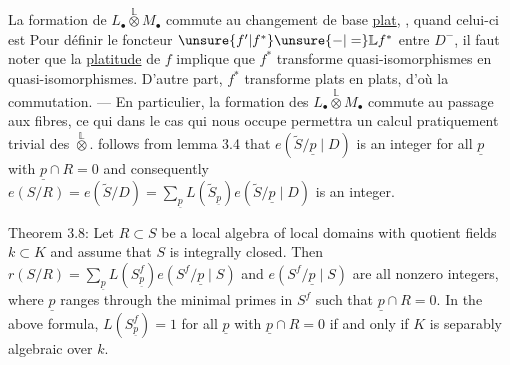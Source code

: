 La formation de $L_\bullet\overset{\mathbb L}{\otimes}M_\bullet$ commute au changement de base \uline{plat}, , quand celui-ci est \deleted{\unsure{défini convenablement} : [\unsure{mais aussi}}
Pour définir le foncteur $\unsure{f'|f^*}\unsure{-|=}\mathbb Lf^*$ entre $D^-$, il faut noter que la \uline{platitude} de $f$ implique que $f^*$ transforme quasi-isomorphismes en quasi-isomorphismes. D'autre part, $f^*$ transforme plats en plats, d'où la commutation.
--- En particulier, la formation des $L_\bullet\overset{\mathbb L}{\otimes}M_\bullet$ commute au passage aux fibres, ce qui dans le cas qui nous occupe permettra  un calcul pratiquement trivial des $\overset{\mathbb L}{\otimes}$.
follows from lemma 3.4 that $e(\widetilde S/\underline p\mid D)$ is an integer for all $\underline p$ with $\underline p\cap R=0$ and consequently $e(S/R)=e(\widetilde S/D)=\sum_{\underline p}L(\widetilde S_{\underline p})e(\widetilde S/\underline p\mid D)$ is an integer.

Theorem 3.8: Let $R\subset S$ be a local algebra of local domains with quotient fields $k\subset K$ and assume that $S$ is integrally closed. Then $r(S/R)=\sum_{\underline p}L(S_{\underline p}^f)e(S^f/\underline p\mid S)$ and $e(S^f/\underline p\mid S)$ are all nonzero integers, where $\underline p$ ranges through the minimal primes in $S^f$ such that $\underline p\cap R=0$. In the above formula, $L(S_{\underline p}^f)=1$ for all $\underline p$ with $\underline p\cap R=0$ if and only if $K$ is separably algebraic over $k$.

